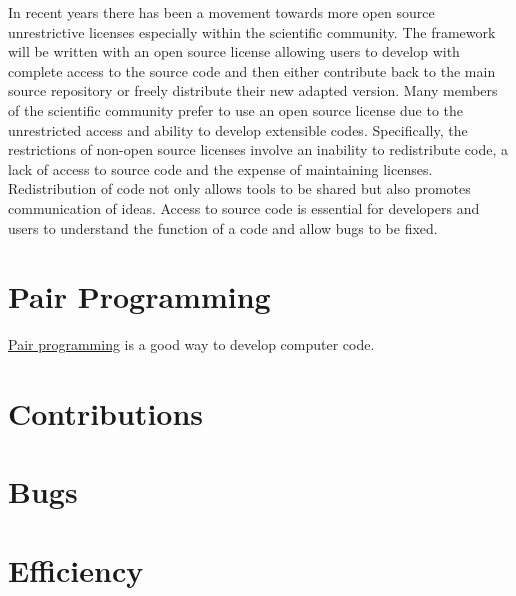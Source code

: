 In recent years there has been a movement towards more open source
unrestrictive licenses especially within the scientific community. The
\FiPy{} framework will be written with an open source license allowing
users to develop with complete access to the source code and then
either contribute back to the main source repository or freely
distribute their new adapted version. Many members of the scientific
community prefer to use an open source license due to the unrestricted
access and ability to develop extensible codes. Specifically, the
restrictions of non-open source licenses involve an inability to
redistribute code, a lack of access to source code and the expense of
maintaining licenses. Redistribution of code not only allows tools to
be shared but also promotes communication of ideas. Access to source
code is essential for developers and users to understand the function
of a code and allow bugs to be fixed.

\section{Pair Programming}

\href{http://www.extremeprogramming.org/rules/pair.html}{Pair programming}
is a good way to develop computer code.

\section{Contributions}

\section{Bugs}

\section{Efficiency}